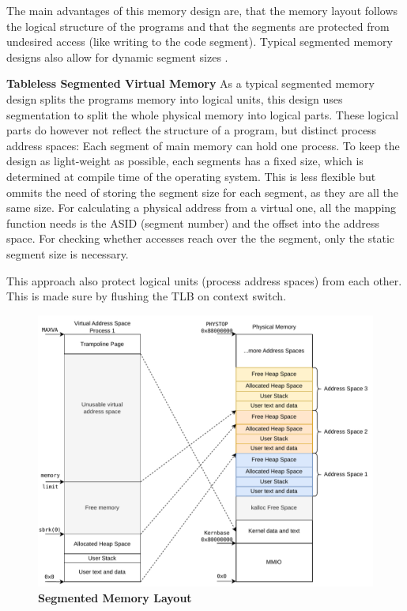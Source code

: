 The main advantages of this memory design are, that the memory layout follows the logical structure of the programs and that the segments are protected from undesired access (like writing to the code segment).
Typical segmented memory designs also allow for dynamic segment sizes \cite{tanenbaumOS}.



\textbf{Tableless Segmented Virtual Memory}
As a typical segmented memory design splits the programs memory into logical units, this design uses segmentation to split the whole physical memory into logical parts.
These logical parts do however not reflect the structure of a program, but distinct process address spaces: Each segment of main memory can hold one process.
To keep the design as light-weight as possible, each segments has a fixed size, which is determined at compile time of the operating system.
This is less flexible but ommits the need of storing the segment size for each segment, as they are all the same size.
For calculating a physical address from a virtual one, all the mapping function needs is the ASID (segment number) and the offset into the address space.
For checking whether accesses reach over the the segment, only the static segment size is necessary.

This approach also protect logical units (process address spaces) from each other. This is made sure
by flushing the TLB on context switch.



\begin{figure}[ht!]
    \centering
    \includegraphics[]{figures/segmented_layout.pdf}
    \caption[Segmented Memory Layout]{\textbf{Segmented Memory Layout}}
    \label{fig:theory:segLayout}
\end{figure}

